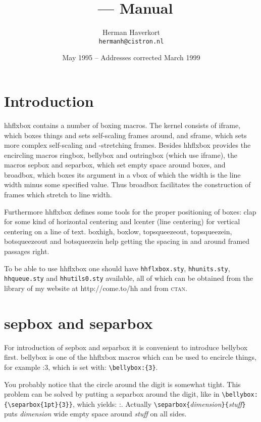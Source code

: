 \documentclass[11pt]{article}
\title{\hhflxbox\ --- Manual}
\author{Herman Haverkort\\\normalsize\normalfont\texttt{hermanh@cistron.nl}}
\date{May 1995 -- Addresses corrected March 1999}
\makeatletter
\def\packagename#1{{\sffamily #1}}     %
\def\macroname#1{{\ttfamily\@ttbs#1}}  %
\def\hhflxbox{\packagename{hhflxbox}\xspace}
\def\={\verb=}
\def\<#1>{\macroname{#1}}
\def\:{\linebreak[1]}
\makeatother
\begin{document}
\maketitle

\section{Introduction}

\hhflxbox contains a number of boxing macros. The kernel consists of
\<iframe>, which boxes things and sets self-scaling frames around, and
\<sframe>, which sets more complex self-scaling and -stretching frames.
Besides \hhflxbox provides the encircling macros \<ringbox>, \<bellybox>
and \<outringbox> (which use \<iframe>), the macros \<sepbox> and
\<separbox>, which set empty space around boxes, and \<broadbox>, which
boxes its argument in a \<vbox> of which the width is the line width
minus some specified value. Thus \<broadbox> facilitates the construction
of frames which stretch to line width.

Furthermore \hhflxbox defines some tools for the proper positioning
of boxes: \<clap> for some kind of horizontal centering
and \<lcenter> (line centering) for vertical centering on a line of
text. \<boxhigh>, \<boxlow>, \<topsqueezeout>, \<topsqueezein>,
\<botsqueezeout> and \<botsqueezein> help getting the spacing in and
around framed passages right.

To be able to use \hhflxbox one should have
\texttt{hhflxbox.sty}, \texttt{hhunits.sty}, \texttt{hhqueue.sty}
and \texttt{hhutils0.sty} available, all of which can be obtained
from the library of my website at
http://come.to/hh and from \textsc{ctan}.

\section{\<sepbox> and \<separbox>}
For introduction of \<sepbox> and \<separbox> it is convenient to
introduce \<bellybox> first. \<bellybox> is one of the
\hhflxbox macros which can be used to encircle things, for example
\bellybox:{3}, which is set with: \=\bellybox=\:\=:{3}=.

You probably notice that the circle around the digit is somewhat
tight. This problem can be solved by putting a \<separbox> around the
digit, like in \=\bellybox=\:\=:{\separbox=\:\={1pt}{3}}=, which
yields: \bellybox:{}.
Actually \=\separbox=\:\={={\it dimension\/}\=}{={\it stuff\/}\=}= puts
{\it dimension\/} wide empty space around {\it stuff\/} on all sides.
\end{document}
